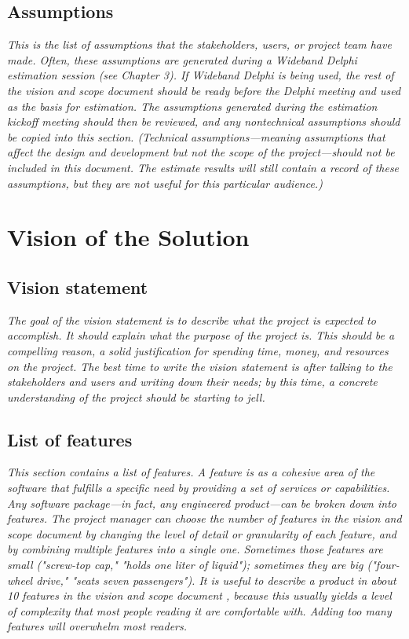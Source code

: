 \documentclass[12pt]{article}
\begin{document}
\subsection{Assumptions}

    \textit{This is the list of assumptions that the stakeholders, users, or
    project team have made. Often, these assumptions are generated
    during a Wideband Delphi estimation session (see Chapter 3). If
    Wideband Delphi is being used, the rest of the vision and scope
    document should be ready before the Delphi meeting and used as the
    basis for estimation. The assumptions generated during the
    estimation kickoff meeting should then be reviewed, and any
    nontechnical assumptions should be copied into this
    section. (Technical assumptions---meaning assumptions that affect
    the design and development but not the scope of the
    project---should not be included in this document. The estimate
    results will still contain a record of these assumptions, but they
    are not useful for this particular audience.)}

\section{Vision of the Solution}

\subsection{Vision statement}

    \textit{The goal of the vision statement is to describe what the project
    is expected to accomplish. It should explain what the purpose of
    the project is. This should be a compelling reason, a solid
    justification for spending time, money, and resources on the
    project. The best time to write the vision statement is after
    talking to the stakeholders and users and writing down their
    needs; by this time, a concrete understanding of the project
    should be starting to jell.}

\subsection{List of features}

    \textit{This section contains a list of features. A feature is as a
    cohesive area of the software that fulfills a specific need by
    providing a set of services or capabilities. Any software
    package---in fact, any engineered product---can be broken down
    into features. The project manager can choose the number of
    features in the vision and scope document by changing the level of
    detail or granularity of each feature, and by combining multiple
    features into a single one. Sometimes those features are small
    ("screw-top cap," "holds one liter of liquid"); sometimes they are
    big ("four-wheel drive," "seats seven passengers"). It is useful
    to describe a product in about 10 features in the vision and scope
    document , because this usually yields a level of complexity that
    most people reading it are comfortable with. Adding too many
    features will overwhelm most readers.}
\end{document}
